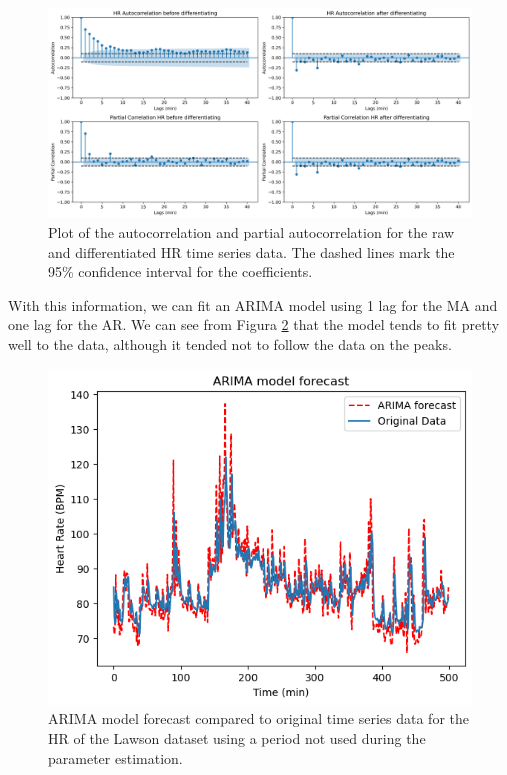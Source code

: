 \documentclass[../main.tex]{subfiles}
\begin{document}
        \begin{figure}[h]
            \begin{center}
            \centering
            \includegraphics[width={\columnwidth}]{images/acf.png}
            \caption{Plot of the autocorrelation and partial autocorrelation for the raw and differentiated HR time series data. The dashed lines mark the 95\% confidence interval for the coefficients.}
            \label{fig:acf}
            \end{center}
        \end{figure}

        With this information, we can fit an ARIMA model using 1 lag for the MA and one lag for the AR. We can see from Figura \ref{fig:arima} that the model tends to fit pretty well to the data, although it tended not to follow the data on the peaks.
        
        \begin{figure}[h]
            \begin{center}
            \centering
            \includegraphics[width={\columnwidth}]{images/ARIMA.png}
            \caption{ARIMA model forecast compared to original time series data for the HR of the Lawson dataset using a period not used during the parameter estimation.}
            \label{fig:arima}
            \end{center}
        \end{figure}



    
\end{document}
